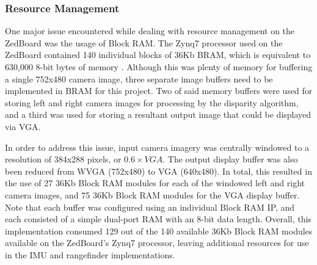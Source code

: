 \subsubsection{Resource Management} \label{dataman}
One major issue encountered while dealing with resource management on the ZedBoard was the usage of Block RAM. The Zynq7 processor used on the ZedBoard contained 140 individual blocks of 36Kb BRAM, which is equivalent to 630,000 8-bit bytes of memory \cite{zynq7bram}. Although this was plenty of memory for buffering a single 752x480 camera image, three separate image buffers need to be implemented in BRAM for this project. Two of said memory buffers were used for storing left and right camera images for processing by the disparity algorithm, and a third was used for storing a resultant output image that could be displayed via VGA.
\par
In order to address this issue, input camera imagery was centrally windowed to a resolution of 384x288 pixels, or $0.6\times{}VGA$. The output display buffer was also been reduced from WVGA (752x480) to VGA (640x480). In total, this resulted in the use of 27 36Kb Block RAM modules for each of the windowed left and right camera images, and 75 36Kb Block RAM modules for the VGA display buffer. Note that each buffer was configured using an individual Block RAM IP, and each consisted of a simple dual-port RAM with an 8-bit data length. Overall, this implementation consumed 129 out of the 140 available 36Kb Block RAM modules available on the ZedBoard's Zynq7 processor, leaving additional resources for use in the IMU and rangefinder implementations. 